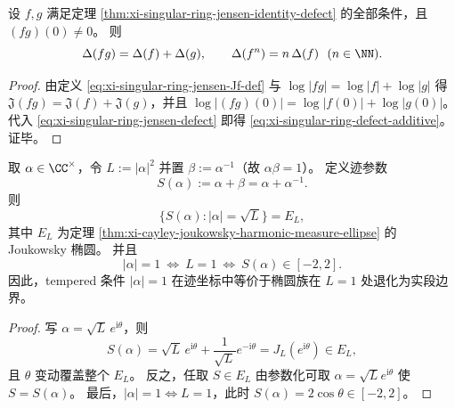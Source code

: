 \begin{proposition}[缺陷的乘法性]\label{prop:xi-singular-ring-defect-multiplicative}
设 \(f,g\) 满足定理 \ref{thm:xi-singular-ring-jensen-identity-defect} 的全部条件，且 \((fg)(0)\neq 0\)。
则
\begin{equation}\label{eq:xi-singular-ring-defect-additive}
\Delta(fg)=\Delta(f)+\Delta(g),
\qquad
\Delta(f^n)=n\,\Delta(f)\ \ (n\in\NN).
\end{equation}
\end{proposition}
\begin{proof}
由定义 \eqref{eq:xi-singular-ring-jensen-Jf-def} 与 \(\log|fg|=\log|f|+\log|g|\) 得
\(\mathfrak J(fg)=\mathfrak J(f)+\mathfrak J(g)\)，并且 \(\log|(fg)(0)|=\log|f(0)|+\log|g(0)|\)。
代入 \eqref{eq:xi-singular-ring-jensen-defect} 即得 \eqref{eq:xi-singular-ring-defect-additive}。证毕。
\end{proof}

\begin{proposition}\label{prop:xi-satake-trace-ellipse-tempered-segment}
取 \(\alpha\in\CC^\times\)，令 \(L:=|\alpha|^2\) 并置 \(\beta:=\alpha^{-1}\)（故 \(\alpha\beta=1\)）。
定义迹参数
\[
S(\alpha):=\alpha+\beta=\alpha+\alpha^{-1}.
\]
则
\[
\{S(\alpha):|\alpha|=\sqrt{L}\}=E_L,
\]
其中 \(E_L\) 为定理 \ref{thm:xi-cayley-joukowsky-harmonic-measure-ellipse} 的 Joukowsky 椭圆。
并且
\[
|\alpha|=1\ \Longleftrightarrow\ L=1\ \Longleftrightarrow\ S(\alpha)\in[-2,2].
\]
因此，tempered 条件 \(|\alpha|=1\) 在迹坐标中等价于椭圆族在 \(L=1\) 处退化为实段边界。
\end{proposition}
\begin{proof}
写 \(\alpha=\sqrt{L}\,e^{\mathrm{i}\theta}\)，则
\[
S(\alpha)=\sqrt{L}\,e^{\mathrm{i}\theta}+\frac{1}{\sqrt{L}}e^{-\mathrm{i}\theta}=J_L(e^{\mathrm{i}\theta})\in E_L,
\]
且 \(\theta\) 变动覆盖整个 \(E_L\)。
反之，任取 \(S\in E_L\) 由参数化可取 \(\alpha=\sqrt{L}e^{\mathrm{i}\theta}\) 使 \(S=S(\alpha)\)。
最后，\(|\alpha|=1\iff L=1\)，此时 \(S(\alpha)=2\cos\theta\in[-2,2]\)。
\end{proof}



